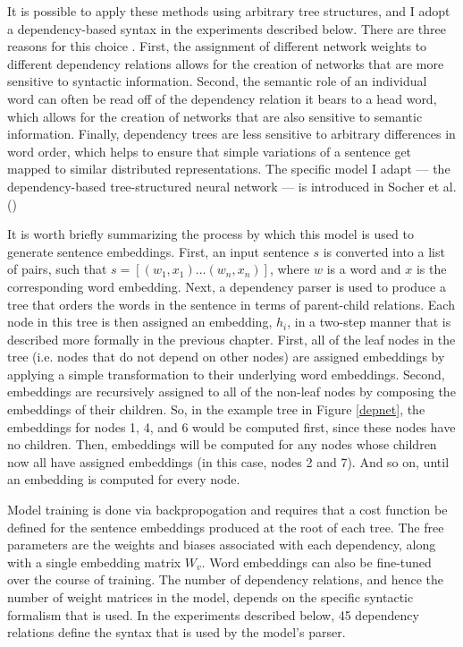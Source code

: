 It is possible to apply these methods using arbitrary tree structures, and I adopt a dependency-based syntax in the experiments described below. There are three reasons for this choice \citep{Socher:2014}. First, the assignment of different network weights to different dependency relations allows for the creation of networks that are more sensitive to syntactic information. Second, the semantic role of an individual word can often be read off of the dependency relation it bears to a head word, which allows for the creation of networks that are also sensitive to semantic information. Finally, dependency trees are less sensitive to arbitrary differences in word order, which helps to ensure that simple variations of a sentence get mapped to similar distributed representations. The specific model I adapt --- the dependency-based tree-structured neural network --- is introduced in Socher et al. (\citeyear{Socher:2014})

It is worth briefly summarizing the process by which this model is used to generate sentence embeddings. First, an input sentence $s$ is converted into a list of pairs, such that $s = [(w_1, x_1)...(w_n, x_n)]$, where $w$ is a word and $x$ is the corresponding word embedding. Next, a dependency parser is used to produce a tree that orders the words in the sentence in terms of parent-child relations. Each node in this tree is then assigned an embedding, $h_i$, in a two-step manner that is described more formally in the previous chapter. First, all of the leaf nodes in the tree (i.e. nodes that do not depend on other nodes) are assigned embeddings by applying a simple transformation to their underlying word embeddings. Second, embeddings are recursively assigned to all of the non-leaf nodes by composing the embeddings of their children. So, in the example tree in Figure \ref{depnet}, the embeddings for nodes 1, 4, and 6 would be computed first, since these nodes have no children. Then, embeddings will be computed for any nodes whose children now all have assigned embeddings (in this case, nodes 2 and 7). And so on, until an embedding is computed for every node.

Model training is done via backpropogation and requires that a cost function be defined for the sentence embeddings produced at the root of each tree. The free parameters are the weights and biases associated with each dependency, along with a single embedding matrix $W_v$. Word embeddings can also be fine-tuned over the course of training. The number of dependency relations, and hence the number of weight matrices in the model, depends on the specific syntactic formalism that is used. In the experiments described below, 45 dependency relations define the syntax that is used by the model's parser.

